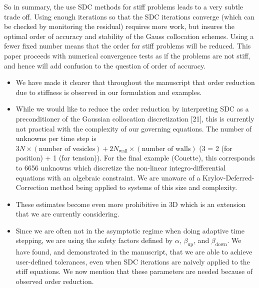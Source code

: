\documentclass[12pt]{article}
\newcommand{\comment}[1]{{\color{blue} #1}}
\begin{document}
\comment{So in summary, the use SDC methods for stiff problems leads to
a very subtle trade off. Using enough iterations so that the SDC
iterations converge (which can be checked by monitoring the residual)
requires more work, but insures the optimal order of accuracy and
stability of the Gauss collocation schemes. Using a fewer fixed number
means that the order for stiff problems will be reduced. This paper
proceeds with numerical convergence tests as if the problems are not
stiff, and hence will add confusion to the question of order of
accuracy.}
\begin{itemize}
  \item We have made it clearer that throughout the manuscript that
  order reduction due to stiffness is observed in our formulation and
  examples.
  \item While we would like to reduce the order reduction by
  interpreting SDC as a preconditioner of the Gaussian collocation
  discretization [21], this is currently not practical with the
  complexity of our governing equations.  The number of unknowns per
  time step is $3N\times(\text{number of vesicles})  +
  2N_{\mathrm{wall}} \times (\text{number of walls})$ (3 = 2 (for
  position) + 1 (for tension)).  For the final example (Couette), this
  corresponds to 6656 unknowns which discretize the non-linear
  integro-differential equations with an algebraic constraint.  We are
  unaware of a Krylov-Deferred-Correction method being applied to
  systems of this size and complexity.
  \item These estimates become even more prohibitive in 3D which is an
  extension that we are currently considering.
  \item Since we are often not in the asymptotic regime when doing
  adaptive time stepping, we are using the safety factors defined by
  $\alpha$, $\beta_{\mathrm{up}}$, and $\beta_{\mathrm{down}}$.  We have
  found, and demonstrated in the manuscript, that we are able to achieve
  user-defined tolerances, even when SDC iterations are naively applied
  to the stiff equations.  We now mention that these parameters are
  needed because of observed order reduction.
\end{itemize}
\end{document}
